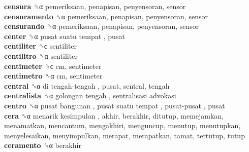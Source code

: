 \textbf{censura} ␝α  pemeriksaan, penapisan, penyensoran, sensor  \\
\textbf{censuramento} ␝α  pemeriksaan, penapisan, penyensoran, sensor  \\
\textbf{censurando} ␝α  pemeriksaan, penapisan, penyensoran, sensor  \\
\textbf{center} ␝α   pusat suatu tempat , pusat  \\
\textbf{centiliter} ␝ϲ  sentiliter  \\
\textbf{centilitro} ␝α  sentiliter  \\
\textbf{centimeter} ␝ϲ  cm, sentimeter  \\
\textbf{centimetro} ␝α  cm, sentimeter  \\
\textbf{central} ␝α   di tengah-tengah , pusat, sentral, tengah  \\
\textbf{centralista} ␝α   golongan tengah ,  sentralisasi advokasi   \\
\textbf{centro} ␝α   pusat bangunan ,  pusat suatu tempat ,  pusat-pusat , pusat  \\
\textbf{cera} ␝α   menarik kesimpulan , akhir, berakhir, ditutup, memejamkan, menamatkan, mencantum, mengakhiri, menguncup, menutup, menutupkan, menyelesaikan, menyimpulkan, merapat, merapatkan, tamat, tertutup, tutup  \\
\textbf{ceramento} ␝α  berakhir  \\
